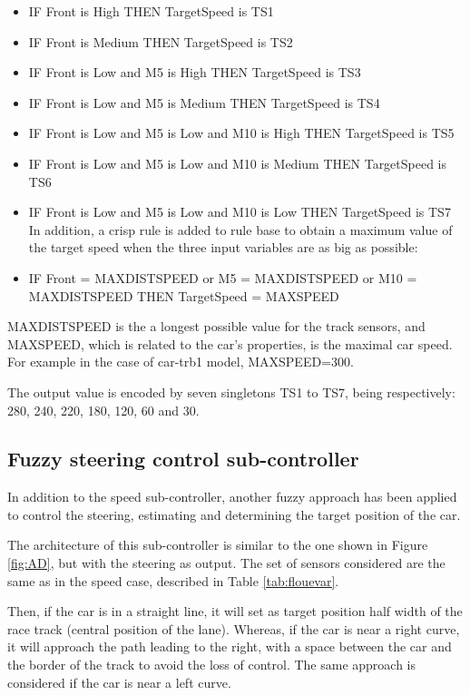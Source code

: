 \documentclass[runningheads,a4paper]{llncs}
\begin{document}
\begin{itemize}
	\item IF Front is High THEN TargetSpeed is TS1
	\item IF Front is Medium THEN TargetSpeed is TS2
	\item IF Front is Low and M5 is High THEN TargetSpeed is TS3
	\item IF Front is Low and M5 is Medium THEN TargetSpeed is TS4
	\item IF Front is Low and M5 is Low and M10 is High THEN TargetSpeed is TS5
	\item IF Front is Low and M5 is Low and M10 is Medium THEN TargetSpeed is TS6
	\item IF Front is Low and M5 is Low and M10 is Low THEN TargetSpeed is TS7\\
	
	In addition, a crisp rule is added to rule base to obtain a maximum value of the target speed when the three input variables are as big as possible: 
	\item IF Front = MAXDISTSPEED or M5 = MAXDISTSPEED or M10 = MAXDISTSPEED THEN TargetSpeed = MAXSPEED		
\end{itemize}

MAXDISTSPEED is the a longest possible value for the track sensors, and MAXSPEED, which is related to the car's properties, is the maximal car speed. For example in the case of car-trb1 model, MAXSPEED=300.

The output value is encoded by seven singletons TS1 to TS7, being respectively: 280, 240, 220, 180, 120, 60 and 30.


\subsection{Fuzzy steering control sub-controller}	

In addition to the speed sub-controller, another fuzzy approach has been applied to control the steering, estimating and determining the target position of the car. 

The architecture of this sub-controller is similar to the one shown in Figure \ref{fig:AD}, but with the steering as output. The set of sensors considered are the same as in the speed case, described in Table \ref{tab:flouevar}.

Then, if the car is in a straight line, it will set as target position half width of the race track (central position of the lane).	Whereas, if the car is near a right curve, it will approach the path leading to the right, with a space between the car and the border of the track to avoid the loss of control. The same approach is considered if the car is near a left curve.
\end{document}
